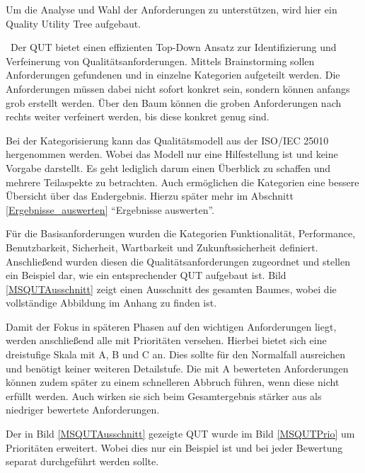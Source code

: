 Um die Analyse und Wahl der Anforderungen zu unterstützen, wird hier ein Quality Utility Tree aufgebaut.

\
Der \ac{QUT} bietet einen effizienten Top-Down Ansatz zur Identifizierung und Verfeinerung von Qualitätsanforderungen. Mittels Brainstorming sollen Anforderungen gefundenen und in einzelne Kategorien aufgeteilt werden. Die Anforderungen müssen dabei nicht sofort konkret sein, sondern können anfangs grob erstellt werden. Über den Baum können die groben Anforderungen nach rechts weiter verfeinert werden, bis diese konkret genug sind. 

Bei der Kategorisierung kann das Qualitätsmodell aus der ISO/IEC 25010 hergenommen werden. Wobei das Modell nur eine Hilfestellung ist und keine Vorgabe darstellt. Es geht lediglich darum einen Überblick zu schaffen und mehrere Teilaspekte zu betrachten. Auch ermöglichen die Kategorien eine bessere Übersicht über das Endergebnis. Hierzu später mehr im Abschnitt \ref{Ergebnisse_auswerten} \enquote{Ergebnisse auswerten}.

Für die Basisanforderungen wurden die Kategorien Funktionalität, Performance, Benutzbarkeit, Sicherheit, Wartbarkeit und Zukunftssicherheit definiert. Anschließend wurden diesen die Qualitätsanforderungen zugeordnet und stellen ein Beispiel dar, wie ein entsprechender \ac{QUT} aufgebaut ist. Bild \ref{MSQUTAusschnitt} zeigt einen Ausschnitt des gesamten Baumes, wobei die vollständige Abbildung im Anhang zu finden ist. 


Damit der Fokus in späteren Phasen auf den wichtigen Anforderungen liegt, werden anschließend alle mit Prioritäten versehen. Hierbei bietet sich eine dreistufige Skala mit A, B und C an. Dies sollte für den Normalfall ausreichen und benötigt keiner weiteren Detailstufe.
Die mit A bewerteten Anforderungen können zudem später zu einem schnelleren Abbruch führen, wenn diese nicht erfüllt werden. Auch wirken sie sich beim Gesamtergebnis stärker aus als niedriger bewertete Anforderungen. 

Der in Bild \ref{MSQUTAusschnitt} gezeigte \ac{QUT} wurde im Bild \ref{MSQUTPrio} um Prioritäten erweitert. Wobei dies nur ein Beispiel ist und bei jeder Bewertung separat durchgeführt werden sollte.


